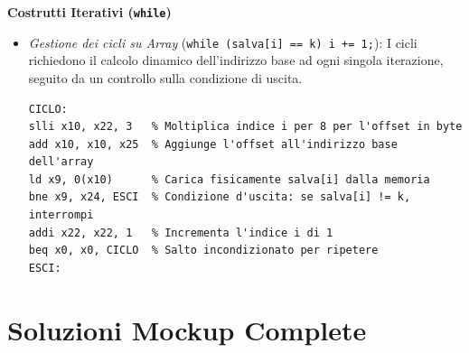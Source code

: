 \documentclass[12pt, a4paper]{article}
\begin{document}
\textbf{Costrutti Iterativi (\texttt{while})}
\begin{itemize}
    \item \textit{Gestione dei cicli su Array} (\texttt{while (salva[i] == k) i += 1;}): I cicli richiedono il calcolo dinamico dell'indirizzo base ad ogni singola iterazione, seguito da un controllo sulla condizione di uscita.
\begin{verbatim}
CICLO:
slli x10, x22, 3   % Moltiplica indice i per 8 per l'offset in byte
add x10, x10, x25  % Aggiunge l'offset all'indirizzo base dell'array
ld x9, 0(x10)      % Carica fisicamente salva[i] dalla memoria
bne x9, x24, ESCI  % Condizione d'uscita: se salva[i] != k, interrompi
addi x22, x22, 1   % Incrementa l'indice i di 1
beq x0, x0, CICLO  % Salto incondizionato per ripetere
ESCI:
\end{verbatim}
\end{itemize}

\section{Soluzioni Mockup Complete}
\end{document}
